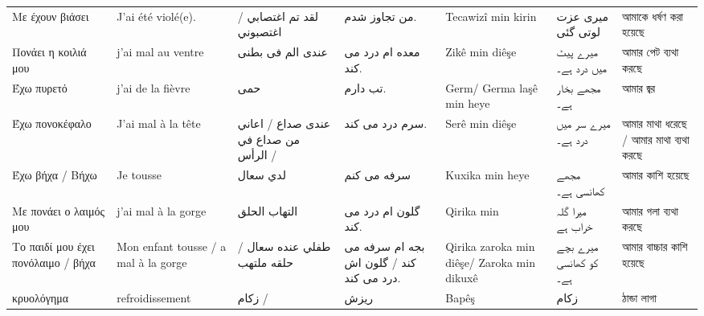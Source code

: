 \begin{longtable}{p{3.5cm} p{3.5cm} p{3.5cm} p{3.5cm} p{3.5cm} p{3.5cm} p{3.5cm} }
 Με έχουν βιάσει                        & J'ai été violé(e).                                  & لقد تم اغتصابي    / اغتصبوني         & من تجاوز شدم.                            & Tecawizî min kirin                          & میری عزت لوتی گئی                 & আমাকে ধর্ষণ করা হয়েছে                   \\
 Πονάει η κοιλιά μου                    & j'ai mal au ventre                                  & عندی الم فی بطنی                     & معده ام درد می کند.                      & Zikê min diêşe                              & میرے پیٹ میں درد ہے۔              & আমার পেট ব্যথা করছে                     \\
 Έχω πυρετό                             & j'ai de la fièvre                                   & حمى                                  & تب دارم.                                 & Germ/ Germa laşê min heye                   & مجھے بخار ہے۔                     & আমার জ্বর                               \\
 Έχω πονοκέφαλο                         & J'ai mal à la tête                                  & عندی صداع / اعاني من صداع في الرأس / & سرم درد می کند.                          & Serê min diêşe                              & میرے سر میں درد ہے۔               & আমার মাথা ধরেছে / আমার মাথা ব্যথা করছে  \\
 Έχω βήχα / Βήχω                        & Je tousse                                           & لدي سعال                             & سرفه می کنم                              & Kuxika min heye                             & مجھے کھانسی ہے۔                   & আমার কাশি  হয়েছে                        \\
 Με πονάει ο λαιμός μου                 & j'ai mal à la gorge                                 & التهاب الحلق                         & گلون ام درد می کند.                      & Qirika min                                  & میرا گلہ خراب ہے                  & আমার গলা ব্যথা করছে                     \\
 Το παιδί μου έχει πονόλαιμο / βήχα     & Mon enfant tousse / a mal à la gorge                & طفلي عنده سعال / حلقه ملتهب          & بجه ام سرفه می کند / گلون اش درد می کند. & Qirika zaroka min diêşe/  Zaroka min dikuxê & میرے بچے کو کھانسی  ہے۔           & আমার বাচ্চার কাশি হয়েছে                 \\
 κρυολόγημα                             & refroidissement                                     & زكام /                               & ریزش                                     & Bapêş                                       & زکام                              & ঠান্ডা লাগা                             \\

\end{longtable}
